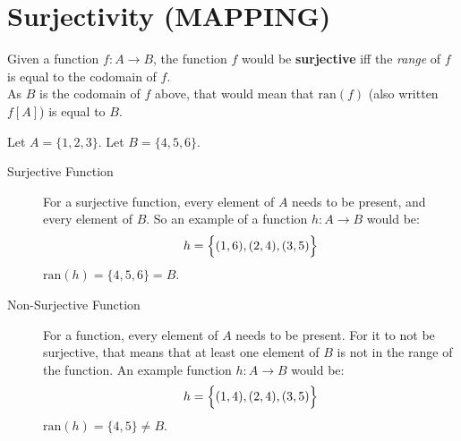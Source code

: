 \documentclass[../notes.tex]{subfiles}
\begin{document}
		\section[Surjectivity]{Surjectivity (MAPPING)}
			Given a function $f: A \rightarrow B$, the function $f$ would be \textbf{surjective} iff the \textit{range} of $f$ is equal to the codomain of $f$.\\
			As $B$ is the codomain of $f$ above, that would mean that $\mathrm{ran}(f)$ (also written $f[A]$) is equal to $B$.
			\begin{examplebox}
				Let $A = \{1, 2, 3\}$. Let $B = \{4, 5, 6\}$.
				\begin{description}
					\item[Surjective Function] For a surjective function, every element of $A$ needs to be present, and every element of $B$. So an example of a function $h: A \rightarrow B$ would be:
						\begin{align*}
							h = \Bigl\{(1, 6), (2, 4), (3, 5)\Bigr\}
						\end{align*}
						$\mathrm{ran}(h) = \{4, 5, 6\} = B$.
					\item[Non-Surjective Function] For a function, every element of $A$ needs to be present. For it to not be surjective, that means that at least one element of $B$ is not in the range of the function. An example function $h: A \rightarrow B$ would be:
						\begin{align*}
							h = \Bigl\{(1, 4), (2, 4), (3, 5)\Bigr\}
						\end{align*}
						$\mathrm{ran}(h) = \{4, 5\} \neq B$.
				\end{description}
			\end{examplebox}
\end{document}
